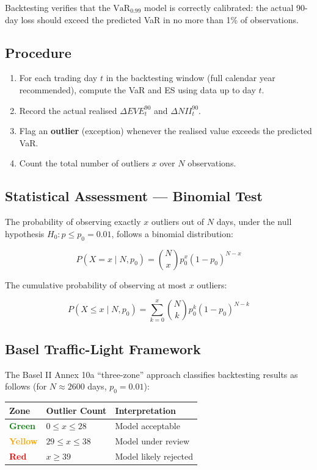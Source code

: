 \documentclass[11pt, a4paper]{article}
\begin{document}
Backtesting verifies that the $\mathrm{VaR}_{0.99}$ model is correctly calibrated: the actual 90-day loss should exceed the predicted VaR in no more than 1\% of observations.

\subsection{Procedure}

\begin{enumerate}
    \item For each trading day $t$ in the backtesting window (full calendar year recommended), compute the VaR and ES using data up to day $t$.
    \item Record the actual realised $\Delta EVE^{90}_t$ and $\Delta NII^{90}_t$.
    \item Flag an \textbf{outlier} (exception) whenever the realised value exceeds the predicted VaR.
    \item Count the total number of outliers $x$ over $N$ observations.
\end{enumerate}

\subsection{Statistical Assessment — Binomial Test}

The probability of observing exactly $x$ outliers out of $N$ days, under the null hypothesis $H_0: p \leq p_0 = 0.01$, follows a binomial distribution:

\[
    P(X = x \mid N, p_0) = \binom{N}{x} p_0^x (1 - p_0)^{N-x}
\]

The cumulative probability of observing at most $x$ outliers:

\[
    P(X \leq x \mid N, p_0) = \sum_{k=0}^{x} \binom{N}{k} p_0^k (1 - p_0)^{N-k}
\]

\subsection{Basel Traffic-Light Framework}

The Basel II Annex 10a ``three-zone'' approach classifies backtesting results as follows (for $N \approx 2600$ days, $p_0 = 0.01$):

\begin{center}
\begin{tabular}{lll}
    \toprule
    \textbf{Zone} & \textbf{Outlier Count} & \textbf{Interpretation} \\
    \midrule
    \textcolor{green}{\textbf{Green}}  & $0 \leq x \leq 28$  & Model acceptable \\
    \textcolor{orange}{\textbf{Yellow}} & $29 \leq x \leq 38$ & Model under review \\
    \textcolor{red}{\textbf{Red}}    & $x \geq 39$         & Model likely rejected \\
    \bottomrule
\end{tabular}
\end{center}
\end{document}

